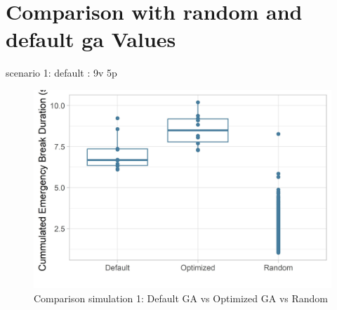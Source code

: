 \section{Comparison with random and default ga Values}
scenario 1: default : 9v 5p
\begin{figure}[ht] 
	\label{figure:sim_1_comparison}
	\includegraphics[width=1\linewidth]{simulations/evaluation/plots/sim_1_comparison}
	\caption{Comparison simulation 1: Default GA vs Optimized GA vs Random}
\end{figure}

